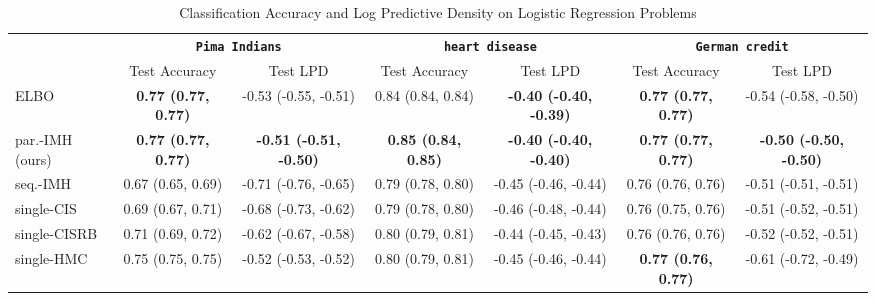 
\begin{table*}
  \vspace{-0.2in}
  \centering
  \caption{Classification Accuracy and Log Predictive Density on Logistic Regression Problems}\label{table:logistic}
  \vspace{-0.05in}
  \setlength{\tabcolsep}{3pt}
  \begin{threeparttable}
  \begin{tabular}{lcccccc}
    \toprule
     & \multicolumn{2}{c}{\textbf{\texttt{Pima Indians}}} & \multicolumn{2}{c}{\textbf{\texttt{heart disease}}} & \multicolumn{2}{c}{\textbf{\texttt{German credit}}} \\
    \cmidrule(lr){2-3}\cmidrule(lr){4-5}\cmidrule(lr){6-7}
    & Test Accuracy & Test LPD
    & Test Accuracy & Test LPD
    & Test Accuracy & Test LPD \\\midrule
    ELBO & \textbf{0.77 {\scriptsize(0.77, 0.77)}} & -0.53 {\scriptsize(-0.55, -0.51)} & 0.84 {\scriptsize(0.84, 0.84)} & \textbf{-0.40 {\scriptsize(-0.40, -0.39)}} & \textbf{0.77 {\scriptsize(0.77, 0.77)}} & -0.54 {\scriptsize(-0.58, -0.50)}  \\\arrayrulecolor{black!30}\midrule
    par.-IMH (ours) & \textbf{0.77 {\scriptsize(0.77, 0.77)}} & \textbf{-0.51 {\scriptsize(-0.51, -0.50)}} & \textbf{0.85 {\scriptsize(0.84, 0.85)}} & \textbf{-0.40 {\scriptsize(-0.40, -0.40)}} & \textbf{0.77 {\scriptsize(0.77, 0.77)}} & \textbf{-0.50 {\scriptsize(-0.50, -0.50)}} \\
    seq.-IMH & 0.67 {\scriptsize(0.65, 0.69)} & -0.71 {\scriptsize(-0.76, -0.65)} & 0.79 {\scriptsize(0.78, 0.80)} & -0.45 {\scriptsize(-0.46, -0.44)} & 0.76 {\scriptsize(0.76, 0.76)} & -0.51 {\scriptsize(-0.51, -0.51)} \\
    single-CIS & 0.69 {\scriptsize(0.67, 0.71)} & -0.68 {\scriptsize(-0.73, -0.62)} & 0.79 {\scriptsize(0.78, 0.80)} & -0.46 {\scriptsize(-0.48, -0.44)} & 0.76 {\scriptsize(0.75, 0.76)} & -0.51 {\scriptsize(-0.52, -0.51)} \\
    single-CISRB & 0.71 {\scriptsize(0.69, 0.72)} & -0.62 {\scriptsize(-0.67, -0.58)} & 0.80 {\scriptsize(0.79, 0.81)} & -0.44 {\scriptsize(-0.45, -0.43)} & 0.76 {\scriptsize(0.76, 0.76)} & -0.52 {\scriptsize(-0.52, -0.51)} \\
    single-HMC & 0.75 {\scriptsize(0.75, 0.75)} & -0.52 {\scriptsize(-0.53, -0.52)} & 0.80 {\scriptsize(0.79, 0.81)} & -0.45 {\scriptsize(-0.46, -0.44)} & \textbf{0.77 {\scriptsize(0.76, 0.77)}} & -0.61 {\scriptsize(-0.72, -0.49)} \\

\end{tabular}
\end{threeparttable}
\end{table*}

